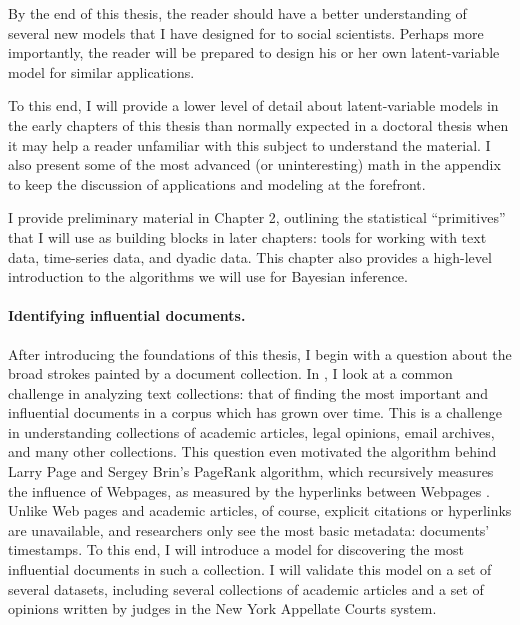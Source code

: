 By the end of this thesis, the reader should have a better
understanding of several new models that I have designed for to social
scientists.  Perhaps more importantly, the reader will be prepared to
design his or her own latent-variable model for similar applications.

To this end, I will provide a lower level of detail about
latent-variable models in the early chapters of this thesis than
normally expected in a doctoral thesis when it may help a reader
unfamiliar with this subject to understand the material.  I also
present some of the most advanced (or uninteresting) math in the
appendix to keep the discussion of applications and modeling at the
forefront.

I provide preliminary material in Chapter 2, outlining the statistical
``primitives'' that I will use as building blocks in later chapters:
tools for working with text data, time-series data, and dyadic data.
This chapter also provides a high-level introduction to the algorithms
we will use for Bayesian inference.

\paragraph{Identifying influential documents.} After introducing the
foundations of this thesis, I begin with a question about the broad
strokes painted by a document collection. In , I
look at a common challenge in analyzing text collections: that of
finding the most important and influential documents in a corpus which
has grown over time.  This is a challenge in understanding collections
of academic articles, legal opinions, email archives, and many other
collections. This question even motivated the algorithm behind Larry
Page and Sergey Brin's PageRank algorithm, which recursively measures
the influence of Webpages, as measured by the hyperlinks between
Webpages \citep{garfield:1992,brin:1998,garfield:2002}.  Unlike Web
pages and academic articles, of course, explicit citations or
hyperlinks are unavailable, and researchers only see the most basic
metadata: documents' timestamps.  To this end, I will introduce a
model for discovering the most influential documents in such a
collection. I will validate this model on a set of several datasets,
including several collections of academic articles and a set of
opinions written by judges in the New York Appellate Courts system.

